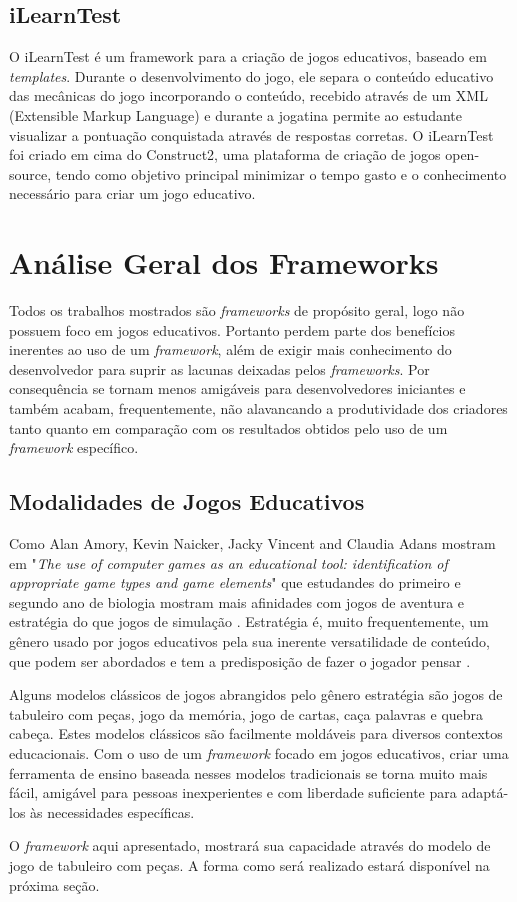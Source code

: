 \subsection{iLearnTest}

O iLearnTest é um framework para a criação de jogos educativos, baseado em \textit{templates}. Durante o desenvolvimento do jogo, ele separa o conteúdo educativo das mecânicas do jogo incorporando o conteúdo, recebido através de um XML (Extensible Markup Language) e durante a jogatina permite ao estudante visualizar a pontuação conquistada  através de respostas corretas. O iLearnTest foi criado em cima do Construct2, uma plataforma de criação de jogos open-source, tendo como objetivo principal minimizar o tempo gasto e o conhecimento necessário para criar um jogo educativo.

\section{Análise Geral dos Frameworks}

Todos os trabalhos mostrados são \textit{frameworks} de propósito geral, logo não possuem foco em jogos educativos. Portanto perdem parte dos benefícios inerentes ao uso de um \textit{framework}, além de exigir mais conhecimento do desenvolvedor para suprir as lacunas deixadas pelos \textit{frameworks}. Por consequência se tornam menos amigáveis para desenvolvedores iniciantes e também acabam, frequentemente, não alavancando a produtividade dos criadores tanto quanto em comparação com os resultados obtidos pelo uso de um \textit{framework} específico.

\subsection{ Modalidades de Jogos Educativos }

Como Alan Amory, Kevin Naicker, Jacky Vincent and Claudia Adans mostram em "\textit{The use of computer games as an educational tool: identification of appropriate game types and game elements}" que estudandes do primeiro e segundo ano de biologia mostram mais afinidades com jogos de aventura e estratégia do que jogos de simulação \cite{jayakanthan2002application}. Estratégia é, muito frequentemente, um gênero usado por jogos educativos pela sua inerente versatilidade de conteúdo, que podem ser abordados e tem a  predisposição de fazer o jogador pensar \cite{milgrom1990rationalizability}.

Alguns modelos clássicos de jogos abrangidos pelo gênero estratégia são jogos de tabuleiro com peças, jogo da memória, jogo de cartas, caça palavras e quebra cabeça. Estes modelos clássicos são facilmente moldáveis para diversos contextos educacionais. Com o uso de um \textit{framework} focado em jogos educativos, criar uma ferramenta de ensino baseada nesses modelos tradicionais se torna muito mais fácil, amigável para pessoas inexperientes e com liberdade suficiente para adaptá-los às necessidades específicas.

O \textit{framework} aqui apresentado, mostrará sua capacidade através do modelo de jogo de tabuleiro com peças. A forma como será realizado estará disponível na próxima seção.